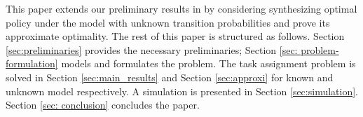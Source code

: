 \documentclass[journal]{IEEEtran}
\begin{document}
This paper extends our preliminary results in \cite{ACC2017} by considering synthesizing optimal policy under the model with unknown transition probabilities and prove its approximate optimality. %
The rest of this paper is structured as follows. Section \ref{sec:preliminaries} provides the necessary preliminaries; Section \ref{sec: problem-formulation} models and formulates the problem. The task assignment problem is solved in Section \ref{sec:main_results} and Section \ref{sec:approxi} for known and unknown model respectively. A simulation is presented in Section \ref{sec:simulation}. Section \ref{sec: conclusion} concludes the paper. 

%
%



\end{document}

